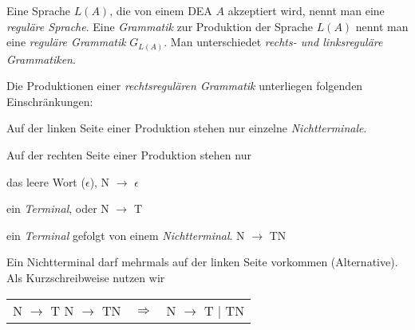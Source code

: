 \documentclass[fontsize=10pt, a4paper, ngerman]{scrartcl}
\begin{document}
\ReiheTitel

Eine Sprache $L(A)$, die von einem DEA $A$ akzeptiert wird, nennt man eine
\emph{reguläre Sprache}. Eine \emph{Grammatik} zur Produktion der Sprache
$L(A)$ nennt man eine \emph{reguläre Grammatik} $G_{L(A)}$. Man unterschiedet
\emph{rechts- und linksreguläre Grammatiken}.

Die Produktionen einer \emph{rechtsregulären Grammatik} unterliegen folgenden Einschränkungen:
\begin{smallitem}
	\item Auf der linken Seite einer Produktion stehen nur einzelne \emph{Nichtterminale}.
	\item Auf der rechten Seite einer Produktion stehen nur
	\begin{smallitem}
		\item das leere Wort ($\epsilon$), \hspace{2cm} N $\rightarrow$ $\epsilon$
		\item ein \emph{Terminal}, oder \hspace{2cm} N $\rightarrow$ T
		\item ein \emph{Terminal} gefolgt von einem \emph{Nichtterminal}.  \hspace{2cm} N $\rightarrow$ TN
	\end{smallitem}
\end{smallitem}

Ein Nichtterminal darf mehrmals auf der linken Seite vorkommen (Alternative). Als
Kurzschreibweise nutzen wir
\begin{center}
\begin{tabular}{p{3cm}cp{3cm}}
N $\rightarrow$ T \newline N $\rightarrow$ TN
& $\Rightarrow$
& N $\rightarrow$ T | TN
\end{tabular}
\end{center}
\end{document}
